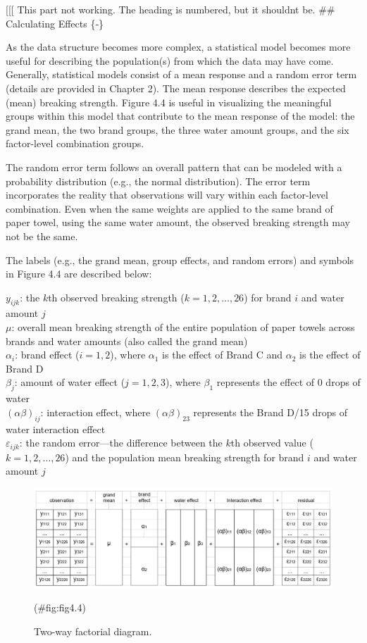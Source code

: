 \documentclass[
]{report}
\begin{document}
{[}{[}{[} This part not working. The heading is numbered, but it shouldnt be.
\#\# Calculating Effects \{‑\}

As the data structure becomes more complex, a statistical model becomes more useful for describing the population(s) from which the data may have come. Generally, statistical models consist of a mean response and a random error term (details are provided in Chapter 2). The mean response describes the expected (mean) breaking strength. Figure 4.4 is useful in visualizing the meaningful groups within this model that contribute to the mean response of the model: the grand mean, the two brand groups, the three water amount groups, and the six factor-level combination groups.

The random error term follows an overall pattern that can be modeled with a probability distribution (e.g., the normal distribution). The error term incorporates the reality that observations will vary within each factor-level combination. Even when the same weights are applied to the same brand of paper towel, using the same water amount, the observed breaking strength may not be the same.

The labels (e.g., the grand mean, group effects, and random errors) and symbols in Figure 4.4 are described below:

\(y_{ijk}\): the \(k\)th observed breaking strength (\(k = 1, 2, \ldots, 26\)) for brand \(i\) and water amount \(j\)\\
\(\mu\): overall mean breaking strength of the entire population of paper towels across brands and water amounts (also called the grand mean)\\
\(\alpha_i\): brand effect (\(i = 1, 2\)), where \(\alpha_1\) is the effect of Brand C and \(\alpha_2\) is the effect of Brand D\\
\(\beta_j\): amount of water effect (\(j = 1, 2, 3\)), where \(\beta_1\) represents the effect of 0 drops of water\\
\((\alpha\beta)_{ij}\): interaction effect, where \((\alpha\beta)_{23}\) represents the Brand D/15 drops of water interaction effect\\
\(\varepsilon_{ijk}\): the random error---the difference between the \(k\)th observed value (\(k = 1, 2, \ldots, 26\)) and the population mean breaking strength for brand \(i\) and water amount \(j\)

\begin{figure}

{\centering \includegraphics[width=0.8\linewidth]{docs/Fig4_4TwoWayDiagram} 

}

\caption{Two-way factorial diagram.}(\#fig:fig4.4)
\end{figure}
\end{document}
